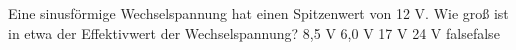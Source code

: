     {Eine sinusförmige Wechselspannung hat einen Spitzenwert von 12 V. Wie groß ist in etwa der Effektivwert der Wechselspannung?}
    {8,5 V}
    {6,0 V}
    {17 V}
    {24 V}
    {false}{false}